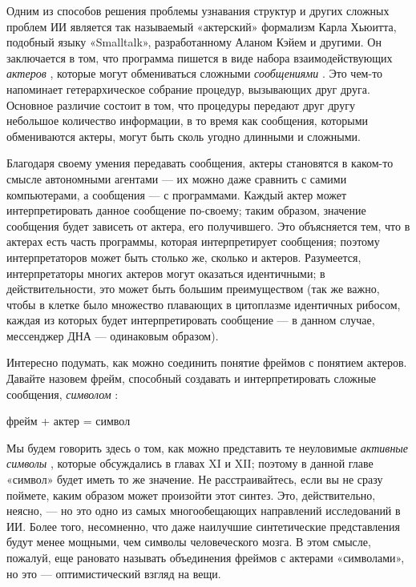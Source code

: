 \documentclass[../main.tex]{subfiles}
\begin{document}
Одним из способов решения проблемы узнавания структур и других сложных проблем ИИ является так называемый «актерский» формализм Карла Хьюитта, подобный языку «Smalltalk», разработанному Аланом Кэйем и другими. Он заключается в том, что программа пишется в виде набора взаимодействующих \emph{актеров} , которые могут обмениваться сложными \emph{сообщениями} . Это чем-то напоминает гетерархическое собрание процедур, вызывающих друг друга. Основное различие состоит в том, что процедуры передают друг другу небольшое количество информации, в то время как сообщения, которыми обмениваются актеры, могут быть сколь угодно длинными и сложными.

Благодаря своему умения передавать сообщения, актеры становятся в каком-то смысле автономными агентами --- их можно даже сравнить с самими компьютерами, а сообщения --- с программами. Каждый актер может интерпретировать данное сообщение по-своему; таким образом, значение сообщения будет зависеть от актера, его получившего. Это объясняется тем, что в актерах есть часть программы, которая интерпретирует сообщения; поэтому интерпретаторов может быть столько же, сколько и актеров. Разумеется, интерпретаторы многих актеров могут оказаться идентичными; в действительности, это может быть большим преимуществом (так же важно, чтобы в клетке было множество плавающих в цитоплазме идентичных рибосом, каждая из которых будет интерпретировать сообщение --- в данном случае, мессенджер ДНА --- одинаковым образом).

Интересно подумать, как можно соединить понятие фреймов с понятием актеров. Давайте назовем фрейм, способный создавать и интерпретировать сложные сообщения, \emph{символом} :

фрейм + актер = символ

Мы будем говорить здесь о том, как можно представить те неуловимые \emph{активные символы} , которые обсуждались в главах XI и XII; поэтому в данной главе «символ» будет иметь то же значение. Не расстраивайтесь, если вы не сразу поймете, каким образом может произойти этот синтез. Это, действительно, неясно, --- но это одно из самых многообещающих направлений исследований в ИИ. Более того, несомненно, что даже наилучшие синтетические представления будут менее мощными, чем символы человеческого мозга. В этом смысле, пожалуй, еще рановато называть объединения фреймов с актерами «символами», но это --- оптимистический взгляд на вещи.
\end{document}
